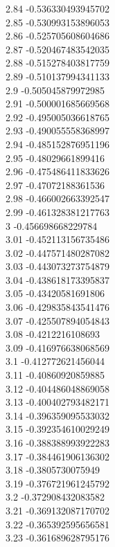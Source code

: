 {2.84	-0.536330493945702\\
2.85	-0.530993153896053\\
2.86	-0.525705608604686\\
2.87	-0.520467483542035\\
2.88	-0.515278403817759\\
2.89	-0.510137994341133\\
2.9	-0.505045879972985\\
2.91	-0.500001685669568\\
2.92	-0.495005036618765\\
2.93	-0.490055558368997\\
2.94	-0.485152876951196\\
2.95	-0.48029661899416\\
2.96	-0.475486411833626\\
2.97	-0.47072188361536\\
2.98	-0.466002663392547\\
2.99	-0.461328381217763\\
3	-0.456698668229784\\
3.01	-0.452113156735486\\
3.02	-0.447571480287082\\
3.03	-0.443073273754879\\
3.04	-0.438618173395837\\
3.05	-0.43420581691806\\
3.06	-0.429835843541476\\
3.07	-0.425507894054843\\
3.08	-0.4212216108693\\
3.09	-0.416976638068569\\
3.1	-0.412772621456044\\
3.11	-0.40860920859885\\
3.12	-0.404486048869058\\
3.13	-0.400402793482171\\
3.14	-0.396359095533032\\
3.15	-0.392354610029249\\
3.16	-0.388388993922283\\
3.17	-0.384461906136302\\
3.18	-0.3805730075949\\
3.19	-0.376721961245792\\
3.2	-0.372908432083582\\
3.21	-0.369132087170702\\
3.22	-0.365392595656581\\
3.23	-0.361689628795176\\
}
